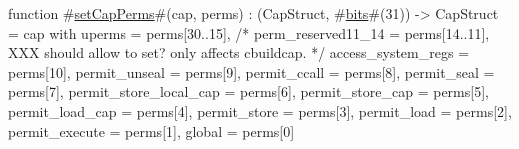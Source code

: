 function #\hyperref[zsetCapPerms]{setCapPerms}#(cap, perms) : (CapStruct, #\hyperref[zbits]{bits}#(31)) -> CapStruct =
    { cap with
      uperms                 = perms[30..15],
      /* perm_reserved11_14     = perms[14..11], XXX should allow to set? only affects cbuildcap. */
      access_system_regs     = perms[10],
      permit_unseal          = perms[9],
      permit_ccall           = perms[8],
      permit_seal            = perms[7],
      permit_store_local_cap = perms[6],
      permit_store_cap       = perms[5],
      permit_load_cap        = perms[4],
      permit_store           = perms[3],
      permit_load            = perms[2],
      permit_execute         = perms[1],
      global                 = perms[0]
   }
